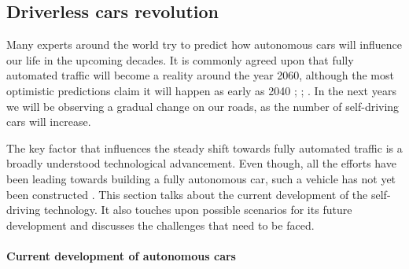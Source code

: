 \documentclass[11pt,english]{article}
\begin{document}


\subsection{Driverless cars revolution}

Many experts around the world try to predict how autonomous cars will influence our life in the upcoming decades. It is commonly agreed upon that fully automated traffic will become a reality around the year 2060, although the most optimistic predictions claim it will happen as early as 2040 \citep{kitti2012we}; \citep{litman2014autonomous}; \citep{sivak2015road}. In the next years we will be observing a gradual change on our roads, as the number of self-driving cars will increase. 
\par
The key factor that influences the steady shift towards fully automated traffic is a broadly understood technological advancement. Even though, all the efforts have been leading towards building a fully autonomous car, such a vehicle has not yet been constructed \citep{litman2014autonomous}. 
This section talks about the current development of the self-driving  technology. It also touches upon possible scenarios for its future development and discusses the challenges that need to be faced.








\paragraph{Current development of autonomous cars}
\end{document}
